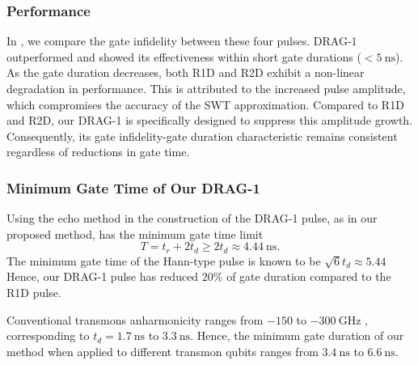 
\subsubsection{Performance}
In , we compare the gate infidelity between these four pulses.
DRAG-1 outperformed and showed its effectiveness within short gate durations ($<5~\text{ns}$).
As the gate duration decreases, both R1D and R2D exhibit a non-linear degradation in performance. This is attributed to
the increased pulse amplitude, which compromises the accuracy of the SWT approximation. Compared to R1D and R2D, our
DRAG-1 is specifically designed to suppress this amplitude growth. Consequently, its gate infidelity-gate duration
characteristic remains consistent regardless of reductions in gate time.
\subsubsection{Minimum Gate Time of Our DRAG-1}
Using the echo method in the construction of the DRAG-1 pulse, as in our proposed method, has
the minimum gate time limit
$$T=t_r+2t_d\geq 2t_d\approx4.44~\text{ns}.$$
The minimum gate time of the Hann-type pulse is known to be $\sqrt{6}t_d\approx5.44$ %
Hence, our DRAG-1 pulse has reduced $20\%$ of gate duration compared to the R1D pulse.

Conventional transmons anharmonicity ranges from $-150$ to $-300~\text{GHz}$ \cite{currentstateofplay}, corresponding to $t_d= 1.7~\text{ns}$ to $3.3~\text{ns}$.
Hence, the minimum gate duration of our method when applied to different transmon qubits ranges from $3.4~\text{ns}$ to
$6.6~\text{ns}$.

